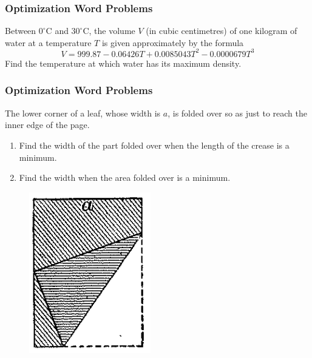 \documentclass[xcolor=dvipsnames]{beamer}
\begin{document}
\begin{frame}
\frametitle{Optimization Word Problems}
Between $0^{\circ}$C and $30^{\circ}$C, the volume $V$ (in cubic centimetres) of one kilogram of water at a temperature $T$ is given approximately by the formula
\begin{equation}
\label{eq:water}
V=999.87-0.06426T+0.0085043T^{2}-0.0000679T^{3}
\end{equation}
Find the temperature at which water has its maximum density.
\end{frame}

\begin{frame}
  \frametitle{Optimization Word Problems}
  {\ubung} The lower corner of a leaf, whose width is $a$, is folded
  over so as just to reach the inner edge of the page.
  \begin{enumerate}
  \item Find the width of the part folded over when the length of the
    crease is a minimum.
  \item Find the width when the area folded over is a minimum.
  \end{enumerate}
  \begin{figure}[h]
    \includegraphics[scale=.4]{./diagrams/optleaf.png}
  \end{figure}
\end{frame}
\end{document}
